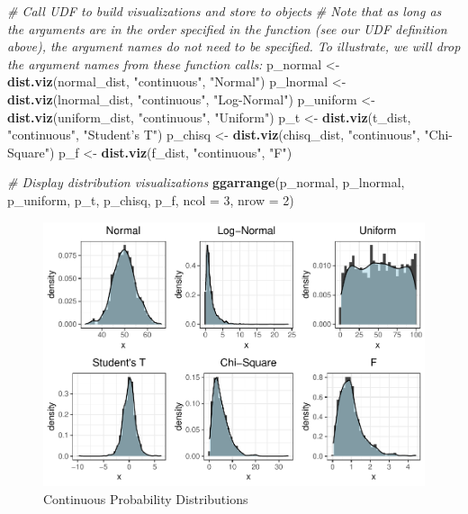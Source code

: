 \documentclass[]{book}
\newenvironment{Shaded}{\begin{snugshade}}{\end{snugshade}}
\newcommand{\CommentTok}[1]{\textcolor[rgb]{0.56,0.35,0.01}{\textit{#1}}}
\newcommand{\DataTypeTok}[1]{\textcolor[rgb]{0.13,0.29,0.53}{#1}}
\newcommand{\DecValTok}[1]{\textcolor[rgb]{0.00,0.00,0.81}{#1}}
\newcommand{\KeywordTok}[1]{\textcolor[rgb]{0.13,0.29,0.53}{\textbf{#1}}}
\newcommand{\NormalTok}[1]{#1}
\newcommand{\StringTok}[1]{\textcolor[rgb]{0.31,0.60,0.02}{#1}}
\begin{document}
\begin{Shaded}
\begin{Highlighting}[]
\CommentTok{# Call UDF to build visualizations and store to objects}
\CommentTok{# Note that as long as the arguments are in the order specified in the function (see our UDF definition above), the argument names do not need to be specified. To illustrate, we will drop the argument names from these function calls:}
\NormalTok{p_normal <-}\StringTok{ }\KeywordTok{dist.viz}\NormalTok{(normal_dist, }\StringTok{"continuous"}\NormalTok{, }\StringTok{"Normal"}\NormalTok{)}
\NormalTok{p_lnormal <-}\StringTok{ }\KeywordTok{dist.viz}\NormalTok{(lnormal_dist, }\StringTok{"continuous"}\NormalTok{, }\StringTok{"Log-Normal"}\NormalTok{)}
\NormalTok{p_uniform <-}\StringTok{ }\KeywordTok{dist.viz}\NormalTok{(uniform_dist, }\StringTok{"continuous"}\NormalTok{, }\StringTok{"Uniform"}\NormalTok{)}
\NormalTok{p_t <-}\StringTok{ }\KeywordTok{dist.viz}\NormalTok{(t_dist, }\StringTok{"continuous"}\NormalTok{, }\StringTok{"Student's T"}\NormalTok{)}
\NormalTok{p_chisq <-}\StringTok{ }\KeywordTok{dist.viz}\NormalTok{(chisq_dist, }\StringTok{"continuous"}\NormalTok{, }\StringTok{"Chi-Square"}\NormalTok{)}
\NormalTok{p_f <-}\StringTok{ }\KeywordTok{dist.viz}\NormalTok{(f_dist, }\StringTok{"continuous"}\NormalTok{, }\StringTok{"F"}\NormalTok{)}

\CommentTok{# Display distribution visualizations}
\KeywordTok{ggarrange}\NormalTok{(p_normal, p_lnormal, p_uniform, p_t, p_chisq, p_f,}
          \DataTypeTok{ncol =} \DecValTok{3}\NormalTok{, }\DataTypeTok{nrow =} \DecValTok{2}\NormalTok{)}
\end{Highlighting}
\end{Shaded}

\begin{figure}

{\centering \includegraphics{People_Analytics_Lifecycle_files/figure-latex/continous-dist-1} 

}

\caption{Continuous Probability Distributions}\label{fig:continous-dist}
\end{figure}
\end{document}

